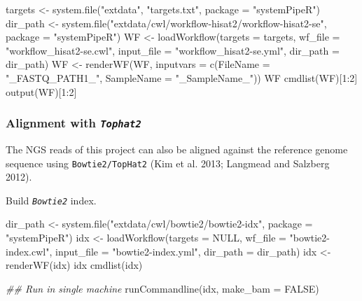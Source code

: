 \documentclass[14pt,]{article}
\newcommand{\hlnum}[1]{\textcolor[rgb]{0.816,0.125,0.439}{#1}}%
\newcommand{\hlstr}[1]{\textcolor[rgb]{0.251,0.627,0.251}{#1}}%
\newcommand{\hlcom}[1]{\textcolor[rgb]{0.502,0.502,0.502}{\textit{#1}}}%
\newcommand{\hlopt}[1]{\textcolor[rgb]{0,0,0}{#1}}%
\newcommand{\hlstd}[1]{\textcolor[rgb]{0.251,0.251,0.251}{#1}}%
\newcommand{\hlkwc}[1]{\textcolor[rgb]{0.251,0.251,0.251}{#1}}%
\newcommand{\hlkwd}[1]{\textcolor[rgb]{0.878,0.439,0.125}{#1}}%
\newenvironment{Shaded}{\begin{myshaded}}{\end{myshaded}}
\newcommand{\KeywordTok}[1]{\hlkwd{#1}}
\newcommand{\DataTypeTok}[1]{\hlkwc{#1}}
\newcommand{\DecValTok}[1]{\hlnum{#1}}
\newcommand{\StringTok}[1]{\hlstr{#1}}
\newcommand{\CommentTok}[1]{\hlcom{#1}}
\newcommand{\OtherTok}[1]{{#1}}
\newcommand{\OperatorTok}[1]{\hlopt{#1}}
\newcommand{\NormalTok}[1]{\hlstd{#1}}
\begin{document}
\begin{Shaded}
\begin{Highlighting}[]
\NormalTok{targets <-}\StringTok{ }\KeywordTok{system.file}\NormalTok{(}\StringTok{"extdata"}\NormalTok{, }\StringTok{"targets.txt"}\NormalTok{, }\DataTypeTok{package =} \StringTok{"systemPipeR"}\NormalTok{)}
\NormalTok{dir_path <-}\StringTok{ }\KeywordTok{system.file}\NormalTok{(}\StringTok{"extdata/cwl/workflow-hisat2/workflow-hisat2-se"}\NormalTok{, }\DataTypeTok{package =} \StringTok{"systemPipeR"}\NormalTok{)}
\NormalTok{WF <-}\StringTok{ }\KeywordTok{loadWorkflow}\NormalTok{(}\DataTypeTok{targets =}\NormalTok{ targets, }\DataTypeTok{wf_file =} \StringTok{"workflow_hisat2-se.cwl"}\NormalTok{, }\DataTypeTok{input_file =} \StringTok{"workflow_hisat2-se.yml"}\NormalTok{, }
    \DataTypeTok{dir_path =}\NormalTok{ dir_path)}
\NormalTok{WF <-}\StringTok{ }\KeywordTok{renderWF}\NormalTok{(WF, }\DataTypeTok{inputvars =} \KeywordTok{c}\NormalTok{(}\DataTypeTok{FileName =} \StringTok{"_FASTQ_PATH1_"}\NormalTok{, }\DataTypeTok{SampleName =} \StringTok{"_SampleName_"}\NormalTok{))}
\NormalTok{WF}
\KeywordTok{cmdlist}\NormalTok{(WF)[}\DecValTok{1}\OperatorTok{:}\DecValTok{2}\NormalTok{]}
\KeywordTok{output}\NormalTok{(WF)[}\DecValTok{1}\OperatorTok{:}\DecValTok{2}\NormalTok{]}
\end{Highlighting}
\end{Shaded}

\hypertarget{alignment-with-tophat2}{%
\subsubsection{\texorpdfstring{Alignment with \emph{\texttt{Tophat2}}}{Alignment with Tophat2}}\label{alignment-with-tophat2}}

The NGS reads of this project can also be aligned against the reference genome
sequence using \texttt{Bowtie2/TopHat2} (Kim et al. 2013; Langmead and Salzberg 2012).

Build \emph{\texttt{Bowtie2}} index.

\begin{Shaded}
\begin{Highlighting}[]
\NormalTok{dir_path <-}\StringTok{ }\KeywordTok{system.file}\NormalTok{(}\StringTok{"extdata/cwl/bowtie2/bowtie2-idx"}\NormalTok{, }\DataTypeTok{package =} \StringTok{"systemPipeR"}\NormalTok{)}
\NormalTok{idx <-}\StringTok{ }\KeywordTok{loadWorkflow}\NormalTok{(}\DataTypeTok{targets =} \OtherTok{NULL}\NormalTok{, }\DataTypeTok{wf_file =} \StringTok{"bowtie2-index.cwl"}\NormalTok{, }\DataTypeTok{input_file =} \StringTok{"bowtie2-index.yml"}\NormalTok{, }
    \DataTypeTok{dir_path =}\NormalTok{ dir_path)}
\NormalTok{idx <-}\StringTok{ }\KeywordTok{renderWF}\NormalTok{(idx)}
\NormalTok{idx}
\KeywordTok{cmdlist}\NormalTok{(idx)}

\CommentTok{## Run in single machine}
\KeywordTok{runCommandline}\NormalTok{(idx, }\DataTypeTok{make_bam =} \OtherTok{FALSE}\NormalTok{)}
\end{Highlighting}
\end{Shaded}
\end{document}
